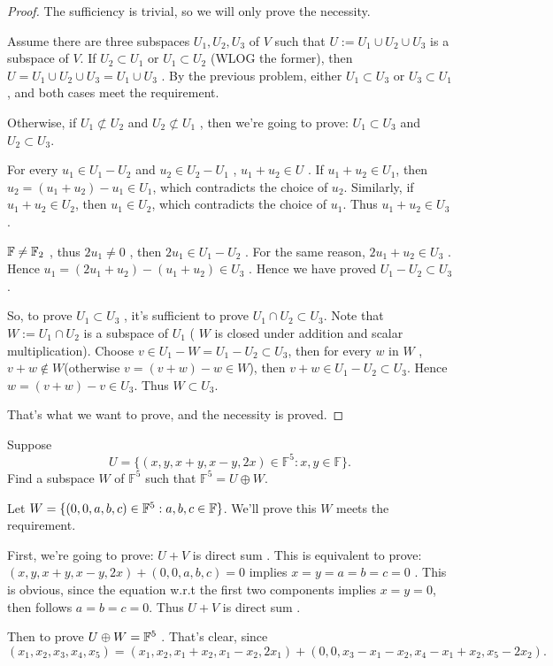 \documentclass{article}
\begin{document}
\begin{proof}
The sufficiency is trivial, so we will only prove the necessity.\par
Assume there are three subspaces $ U_1, U_2, U_3 $ of $ V $ such that $ U:=U_1\cup U_2\cup U_3 $ is a subspace of $ V $. If $ U_2\subset U_1 $ or $ U_1\subset U_2 $ (WLOG the former), then $ U=U_1\cup U_2\cup U_3=U_1\cup U_3 $ . By the previous problem, either $ U_1\subset U_3 $ or $ U_3\subset U_1 $, and both cases meet the requirement.\par
Otherwise, if  $ U_1\not\subset U_2 $ and $ U_2\not\subset U_1$ , then we're going to prove: $ U_1\subset U_3 $ and $ U_2\subset U_3 $.\par 
For every $ u_1\in U_1-U_2 $ and $ u_2\in U_2-U_1 $ , $ u_1+u_2\in U $ . If $ u_1+u_2\in U_1 $, then $ u_2=(u_1+u_2)-u_1\in U_1 $, which contradicts the choice of $ u_2 $. Similarly, if $ u_1+u_2\in U_2 $, then $ u_1\in U_2 $, which contradicts the choice of $ u_1 $. Thus $ u_1+u_2\in U_3 $. \par 
 $ \mathbb{F}\neq\mathbb{F}_2 $ , thus $ 2u_1\neq 0 $ , then $ 2u_1\in U_1-U_2 $ . For the same reason,  $ 2u_1+u_2\in U_3 $ . Hence  $ u_1=(2u_1+u_2)-(u_1+u_2)\in U_3 $ . Hence we have proved  $ U_1-U_2\subset U_3 $ .\par 
So, to prove  $ U_1\subset U_3 $ , it's sufficient to prove  $ U_1\cap U_2\subset U_3 $. Note that $ W:=U_1\cap U_2 $ is a subspace of  $ U_1 $ ( $ W $ is closed under addition and scalar multiplication). Choose  $ v\in U_1-W=U_1-U_2\subset U_3$, then for every  $ w $ in $ W $ , $ v+w\not\in W $(otherwise $ v=(v+w)-w\in W $), then $ v+w\in U_1-U_2\subset U_3 $. Hence  $ w=(v+w)-v\in U_3 $. Thus $ W\subset U_3 $. \par 
That's what we want to prove, and the necessity is proved.
\end{proof}

\begin{problem}[1C-21]
Suppose
\[
U = \{(x, y, x + y, x - y, 2x) \in \mathbb{F}^5 : x, y \in \mathbb{F}\}.
\]
Find a subspace \( W \) of \( \mathbb{F}^5 \) such that \( \mathbb{F}^5 = U \oplus W \).
\end{problem}

\begin{solution}
Let  $ W=\{(0,0,a,b,c)\in\mathbb{F}^5: a,b,c\in\mathbb{F}\} $. We'll prove this $ W $ meets the requirement.\par 
First, we're going to prove: $ U+V $ is direct sum . This is equivalent to prove: $ (x,y,x+y,x-y,2x)+(0,0,a,b,c)=0 $ implies  $ x=y=a=b=c=0 $ . This is obvious, since the equation w.r.t the first two components implies $ x=y=0 $, then follows $ a=b=c=0 $. Thus  $ U+V $ is direct sum .\par
Then to prove  $ U\oplus W=\mathbb{F}^5 $ . That's clear, since
\[ (x_1,x_2,x_3,x_4,x_5)=(x_1,x_2,x_1+x_2,x_1-x_2,2x_1)+(0,0,x_3-x_1-x_2,x_4-x_1+x_2,x_5-2x_2). \] 
\end{solution}
\end{document}
